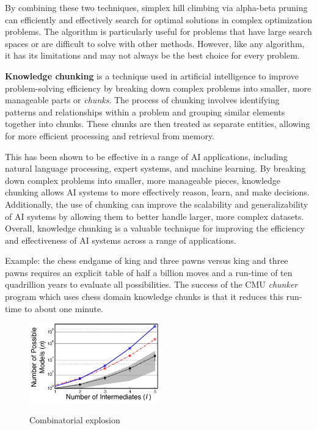 By combining these two techniques, simplex hill climbing via alpha-beta pruning can efficiently and effectively search for optimal 
solutions in complex optimization problems. The algorithm is particularly useful for problems that have large search spaces or are 
difficult to solve with other methods. However, like any algorithm, it has its limitations and may not always be the best choice 
for every problem. \cite{pruning}

\textbf{Knowledge chunking} is a technique used in artificial intelligence to improve problem-solving efficiency by breaking down complex problems 
into smaller, more manageable parts or \emph{chunks}. The process of chunking involves identifying patterns and relationships within a problem 
and grouping similar elements together into chunks. These chunks are then treated as separate entities, allowing for more efficient processing and retrieval from memory.

This has been shown to be effective in a range of AI applications, including natural language processing, expert systems, 
and machine learning. By breaking down complex problems into smaller, more manageable pieces, knowledge chunking allows AI systems to 
more effectively reason, learn, and make decisions. Additionally, the use of chunking can improve the scalability and generalizability 
of AI systems by allowing them to better handle larger, more complex datasets. Overall, knowledge chunking is a valuable technique for 
improving the efficiency and effectiveness of AI systems across a range of applications. \cite{knowledgechunking}

Example: the chess endgame of king and three pawns versus king 
and three pawns requires an explicit table of half a billion 
moves and a run-time of ten quadrillion years to evaluate all
possibilities. The success of the CMU \emph{chunker} program which
uses chess domain knowledge chunks is that it reduces this
run-time to about one minute.
\\
\begin{figure}[htb]
    \centering
    \includegraphics[width=0.5\textwidth]{pics/combiexplo.png}
    \caption{Combinatorial explosion} 
    \cite{combiexplo}
    \label{fig:combiexplo}
\end{figure}
\\
